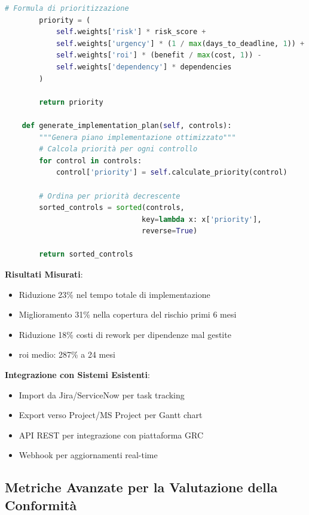 \begin{tcolorbox}
\begin{lstlisting}[language=Python]
        # Formula di prioritizzazione
        priority = (
            self.weights['risk'] * risk_score +
            self.weights['urgency'] * (1 / max(days_to_deadline, 1)) +
            self.weights['roi'] * (benefit / max(cost, 1)) -
            self.weights['dependency'] * dependencies
        )
        
        return priority
    
    def generate_implementation_plan(self, controls):
        """Genera piano implementazione ottimizzato"""
        # Calcola priorità per ogni controllo
        for control in controls:
            control['priority'] = self.calculate_priority(control)
        
        # Ordina per priorità decrescente
        sorted_controls = sorted(controls, 
                                key=lambda x: x['priority'], 
                                reverse=True)
        
        return sorted_controls
\end{lstlisting}

\vspace{0.3cm}
\textbf{Risultati Misurati}:
\begin{itemize}
\item Riduzione 23\% nel tempo totale di implementazione
\item Miglioramento 31\% nella copertura del rischio primi 6 mesi
\item Riduzione 18\% costi di rework per dipendenze mal gestite
\item \gls{roi} medio: 287\% a 24 mesi
\end{itemize}

\vspace{0.3cm}
\textbf{Integrazione con Sistemi Esistenti}:
\begin{itemize}
\item Import da Jira/ServiceNow per task tracking
\item Export verso Project/MS Project per Gantt chart
\item API REST per integrazione con piattaforma GRC
\item Webhook per aggiornamenti real-time
\end{itemize}
\end{tcolorbox}

\subsection{\texorpdfstring{Metriche Avanzate per la Valutazione della Conformità}{4.7.2 - Metriche Avanzate per la Valutazione della Conformità}}

